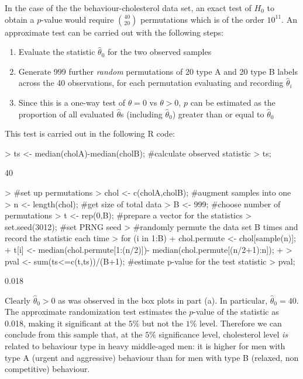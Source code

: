 \documentclass[a4paper,11pt]{article}
\begin{document}
In the case of the the behaviour-cholesterol data set, an exact test
of $H_0$ to obtain a $p$-value would require $\binom{40}{20}$
permutations which is of the order $10^{11}$. An approximate test can
be carried out with the following steps:

\begin{enumerate}
  \item Evaluate the statistic $\hat\theta_0$ for the two observed samples
  \item Generate 999 further {\em random} permutations of 20 type A
    and 20 type B labels across the 40 observations, for each permutation
    evaluating and recording $\hat\theta_i$
  \item Since this is a one-way test of $\theta=0$ vs $\theta > 0$,
    $p$ can be estimated as the proportion of all evaluated $\hat\theta$s
    (including $\hat\theta_0$) greater than or equal to $\hat\theta_0$
\end{enumerate}

This test is carried out in the following R code:
\begin{Schunk}
\begin{Sinput}
> ts <- median(cholA)-median(cholB); #calculate observed statistic
> ts;
\end{Sinput}
\begin{Soutput}
[1] 40
\end{Soutput}
\begin{Sinput}
> #set up permutations
> chol <- c(cholA,cholB); #augment samples into one
> n <- length(chol);      #get size of total data
> B <- 999;               #choose number of permutations
> t <- rep(0,B);          #prepare a vector for the statistics
> set.seed(3012);         #set PRNG seed
> #randomly permute the data set B times and record the statistic each time
> for (i in 1:B) {
+  chol.permute <- chol[sample(n)];
+  t[i] <- median(chol.permute[1:(n/2)])- median(chol.permute[(n/2+1):n]);
+ }
> pval <- sum(ts<=c(t,ts))/(B+1); #estimate p-value for the test statistic
> pval;
\end{Sinput}
\begin{Soutput}
[1] 0.018
\end{Soutput}
\end{Schunk}

Clearly $\hat\theta_0>0$ as was observed in the box plots in part
(a). In particular, $\hat\theta_0=40$. The approximate randomization
test estimates the $p$-value of the statistic as 0.018, making it
significant at the $5\%$ but not the $1\%$ level. Therefore we can
conclude from this sample that, at the $5\%$ significance level,
cholesterol level {\em is} related to behaviour type in heavy
middle-aged men: it is higher for men with type A (urgent and
aggressive) behaviour than for men with type B (relaxed, non
competitive) behaviour.
\end{document}
